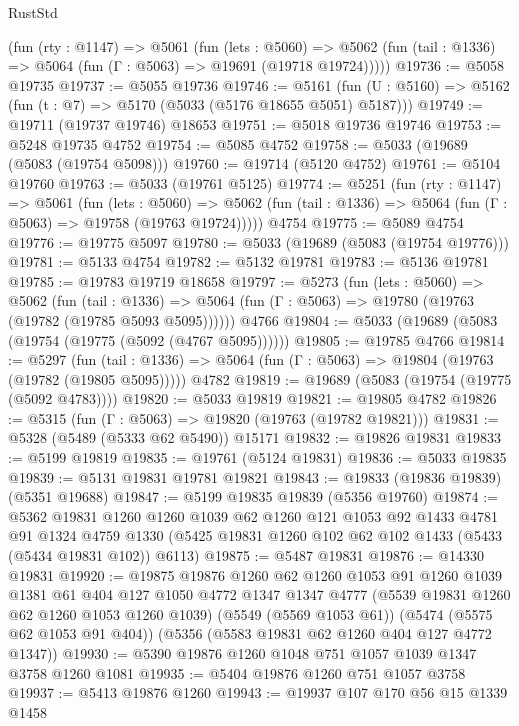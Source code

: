 \begin{lexlean}{RustStd}
\begin{coremodule}
    (fun (rty : @1147) =>
    @5061
      (fun (lets : @5060) =>
      @5062 (fun (tail : @1336) => @5064 (fun (Γ : @5063) => @19691 (@19718 @19724)))))
@19736 := @5058 @19735
@19737 := @5055 @19736
@19746 := @5161
    (fun (U : @5160) => @5162 (fun (t : @7) => @5170 (@5033 (@5176 @18655 @5051) @5187)))
@19749 := @19711 (@19737 @19746) @18653
@19751 := @5018 @19736 @19746
@19753 := @5248 @19735 @4752
@19754 := @5085 @4752
@19758 := @5033 (@19689 (@5083 (@19754 @5098)))
@19760 := @19714 (@5120 @4752)
@19761 := @5104 @19760
@19763 := @5033 (@19761 @5125)
@19774 := @5251
    (fun (rty : @1147) =>
    @5061
      (fun (lets : @5060) =>
      @5062 (fun (tail : @1336) => @5064 (fun (Γ : @5063) => @19758 (@19763 @19724)))))
    @4754
@19775 := @5089 @4754
@19776 := @19775 @5097
@19780 := @5033 (@19689 (@5083 (@19754 @19776)))
@19781 := @5133 @4754
@19782 := @5132 @19781
@19783 := @5136 @19781
@19785 := @19783 @19719 @18658
@19797 := @5273
    (fun (lets : @5060) =>
    @5062
      (fun (tail : @1336) =>
      @5064 (fun (Γ : @5063) => @19780 (@19763 (@19782 (@19785 @5093 @5095))))))
    @4766
@19804 := @5033 (@19689 (@5083 (@19754 (@19775 (@5092 (@4767 @5095))))))
@19805 := @19785 @4766
@19814 := @5297
    (fun (tail : @1336) => @5064 (fun (Γ : @5063) => @19804 (@19763 (@19782 (@19805 @5095)))))
    @4782
@19819 := @19689 (@5083 (@19754 (@19775 (@5092 @4783))))
@19820 := @5033 @19819
@19821 := @19805 @4782
@19826 := @5315 (fun (Γ : @5063) => @19820 (@19763 (@19782 @19821)))
@19831 := @5328 (@5489 (@5333 @62 @5490)) @15171
@19832 := @19826 @19831
@19833 := @5199 @19819
@19835 := @19761 (@5124 @19831)
@19836 := @5033 @19835
@19839 := @5131 @19831 @19781 @19821
@19843 := @19833 (@19836 @19839) (@5351 @19688)
@19847 := @5199 @19835 @19839 (@5356 @19760)
@19874 := @5362
    @19831
    @1260
    @1260
    @1039
    @62
    @1260
    @121
    @1053
    @92
    @1433
    @4781
    @91
    @1324
    @4759
    @1330
    (@5425 @19831 @1260 @102 @62 @102 @1433 (@5433 (@5434 @19831 @102)) @6113)
@19875 := @5487 @19831
@19876 := @14330 @19831
@19920 := @19875
    @19876
    @1260
    @62
    @1260
    @1053
    @91
    @1260
    @1039
    @1381
    @61
    @404
    @127
    @1050
    @4772
    @1347
    @1347
    @4777
    (@5539 @19831 @1260 @62 @1260 @1053 @1260 @1039)
    (@5549 (@5569 @1053 @61))
    (@5474 (@5575 @62 @1053 @91 @404))
    (@5356 (@5583 @19831 @62 @1260 @404 @127 @4772 @1347))
@19930 := @5390 @19876 @1260 @1048 @751 @1057 @1039 @1347 @3758 @1260 @1081
@19935 := @5404 @19876 @1260 @751 @1057 @3758
@19937 := @5413 @19876 @1260
@19943 := @19937 @107 @170 @56 @15 @1339 @1458

\end{coremodule}
\end{lexlean}
